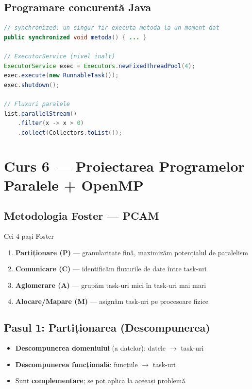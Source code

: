 \documentclass[a4paper,11pt]{article}
\begin{document}
\subsection{Programare concurentă Java}

\begin{lstlisting}[language=Java]
// synchronized: un singur fir executa metoda la un moment dat
public synchronized void metoda() { ... }

// ExecutorService (nivel inalt)
ExecutorService exec = Executors.newFixedThreadPool(4);
exec.execute(new RunnableTask());
exec.shutdown();

// Fluxuri paralele
list.parallelStream()
    .filter(x -> x > 0)
    .collect(Collectors.toList());
\end{lstlisting}

\section{Curs 6 — Proiectarea Programelor Paralele + OpenMP}

\subsection{Metodologia Foster — PCAM}

\begin{defbox}{Cei 4 pași Foster}
\begin{enumerate}[noitemsep]
  \item \textbf{Partiționare (P)} — granularitate fină, maximizăm potențialul de paralelism
  \item \textbf{Comunicare (C)} — identificăm fluxurile de date între task-uri
  \item \textbf{Aglomerare (A)} — grupăm task-uri mici în task-uri mai mari
  \item \textbf{Alocare/Mapare (M)} — asignăm task-uri pe procesoare fizice
\end{enumerate}
\end{defbox}

\subsection{Pasul 1: Partiționarea (Descompunerea)}

\begin{itemize}[noitemsep]
  \item \textbf{Descompunerea domeniului} (a datelor): datele $\to$ task-uri
  \item \textbf{Descompunerea funcțională}: funcțiile $\to$ task-uri
  \item Sunt \textbf{complementare}; se pot aplica la aceeași problemă
\end{itemize}
\end{document}
